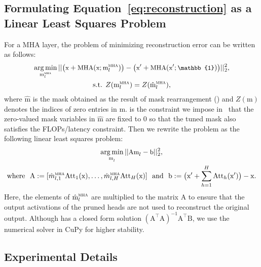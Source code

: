 
\subsection{\textbf{Formulating Equation~\ref{eq:reconstruction} as a Linear Least Squares Problem}}
\label{appendix:derivation_lsa}

For a MHA layer, the problem of minimizing reconstruction error can be written as follows:
\begin{gather}
\small
    \argmin_{\text{m}^{\textsc{mha}}_l} || \big(\text{x}  + \text{MHA}(\text{x}; \text{m}^{\textsc{mha}}_l)\big) - \big(\text{x}' + \text{MHA}(\text{x}'; \mathbb{1})\big) ||_2^2,  \\
    \text{s.t. } Z(\text{m}^{\textsc{mha}}_l) = Z({\hat{\text{m}}}^{\textsc{mha}}_l), \label{eq:reconstruction_constraint}
\end{gather}
where ${\hat{\text{m}}}$ is the mask obtained as the result of mask rearrangement () and
$Z(\text{m})$ denotes the indices of zero entries in $\text{m}$.
 is the constraint we impose in~ that the zero-valued mask variables in ${\hat{\text{m}}}$ are fixed to 0 so that the tuned mask also satisfies the FLOPs/latency constraint.
Then we rewrite the problem as the following linear least squares problem:
\begin{gather}
\small
    \operatorname*{arg\,min}_{\text{m}^{}_l} || \text{A} \text{m}^{}_l - \text{b}  ||_2^2, \label{eq:least_squares} \\
    \text{where } \ \text{A} := [\hat{m}^{\textsc{mha}}_{l,1} \text{Att}_1(\text{x}), \dots, \hat{m}^{\textsc{mha}}_{l,H} \text{Att}_H(\text{x})] \ \text{ and } \ \text{b} := \big(\text{x}' + \sum_{h=1}^{H} \text{Att}_h(\text{x}')\big) - \text{x}.
\end{gather}
Here, the elements of $\hat{\text{m}}^\textsc{mha}_l$ are multiplied to the matrix $\text{A}$ to ensure that the output activations of the pruned heads are not used to reconstruct the original output.
Although  has a closed form solution $ (\text{A}^\intercal \text{A})^{-1} \text{A}^\intercal \text{B}$, we use the numerical solver in CuPy for higher stability. 

\subsection{\textbf{Experimental Details}}
\label{appendix:eval_details}

